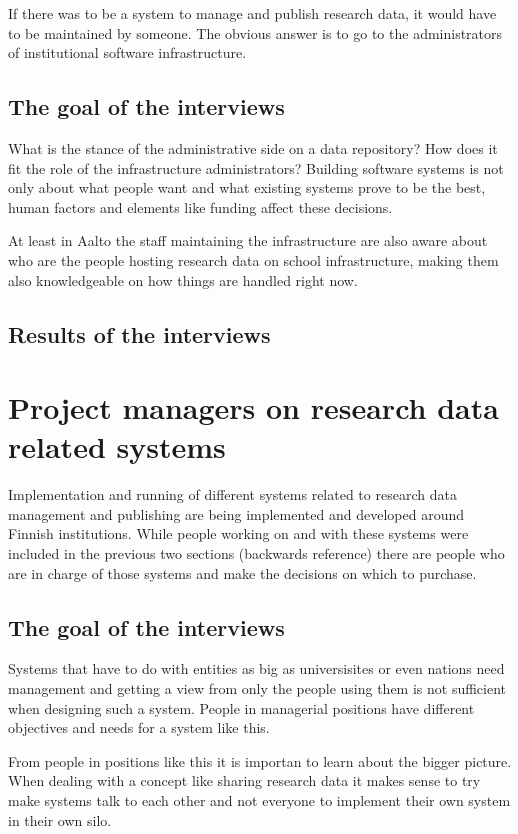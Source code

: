 If there was to be a system to manage and publish research data, it would have
to be maintained by someone. The obvious answer is to go to the administrators
of institutional software infrastructure.

\subsection{The goal of the interviews}

What is the stance of the administrative side on a data repository? How does it
fit the role of the infrastructure administrators? Building software systems is
not only about what people want and what existing systems prove to be the best,
human factors and elements like funding affect these decisions.

At least in Aalto the staff maintaining the infrastructure are also aware about
who are the people hosting research data on school infrastructure, making them
also knowledgeable on how things are handled right now.

\subsection{Results of the interviews}

\section{Project managers on research data related systems}

Implementation and running of different systems related to research data
management and publishing are being implemented and developed around Finnish
institutions. While people working on and with these systems were included in
the previous two sections (backwards reference) there are people who are in
charge of those systems and make the decisions on which to purchase.

\subsection{The goal of the interviews}

Systems that have to do with entities as big as universisites or even nations
need management and getting a view from only the people using them is not
sufficient when designing such a system. People in managerial positions have
different objectives and needs for a system like this.

From people in positions like this it is importan to learn about the bigger
picture. When dealing with a concept like sharing research data it makes sense
to try make systems talk to each other and not everyone to implement their own
system in their own silo.

